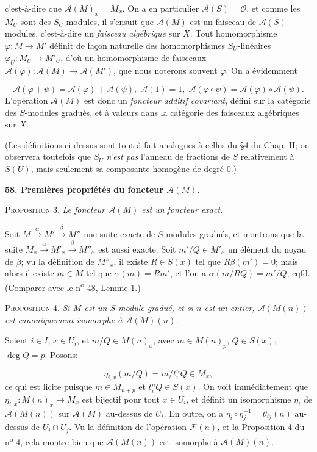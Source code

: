 
 c'est-à-dire que $\mathcal{A}(M)_x = M_x$. On a en particulier $\mathcal{A}(S) = \mathcal{O}$, et comme les $M_U$ sont des $S_U$-modules, il s'ensuit que $\mathcal{A}(M)$ est un faisceau de $\mathcal{A}(S)$-modules, c'est-à-dire un \textit{faisceau algébrique} sur $X$. Tout homomorphisme $\varphi : M \to M'$ définit de façon naturelle des homomorphismes $S_U$-linéaires $\varphi_U : M_U \to M'_U$, d'où un homomorphisme de faisceaux $\mathcal{A}(\varphi) : \mathcal{A}(M) \to \mathcal{A}(M')$, que nous noterons souvent $\varphi$. On a évidemment

\begin{equation*}
\mathcal{A}(\varphi + \psi) = \mathcal{A}(\varphi) + \mathcal{A}(\psi), \; \mathcal{A}(1) = 1, \; \mathcal{A}(\varphi \circ \psi) = \mathcal{A}(\varphi) \circ \mathcal{A}(\psi).
\end{equation*}
L'opération $\mathcal{A}(M)$ est donc un \textit{foncteur additif covariant}, défini sur la catégorie des $S$-modules gradués, et à valeurs dans la catégorie des faisceaux algébriques sur $X$.

(Les définitions ci-dessus sont tout à fait analogues à celles du §4 du Chap. II; on observera toutefois que $S_U$ \textit{n'est pas} l'anneau de fractions de $S$ relativement à $S(U)$, mais seulement sa composante homogène de degré 0.)


\textbf{58. Premières propriétés du foncteur $\mathcal{A}(M)$.}

\textsc{Proposition} 3. \textit{Le foncteur $\mathcal{A}(M)$ est un foncteur exact.}

Soit $M \xrightarrow{\alpha} M' \xrightarrow{\beta} M''$ une suite exacte de $S$-modules gradués, et montrons que la suite $M_x \xrightarrow{\alpha} M'_x \xrightarrow{\beta} M''_x$ est aussi exacte. Soit $m'/Q \in M'_x$ un élément du noyau de $\beta$; vu la définition de $M''_x$, il existe $R \in S(x)$ tel que $R\beta(m') = 0$; mais alors il existe $m \in M$ tel que $\alpha(m) = Rm'$, et l'on a $\alpha(m/RQ) = m'/Q$, cqfd. (Comparer avec le n\textsuperscript{o} 48, Lemme 1.)

\textsc{Proposition} 4. \textit{Si $M$ est un $S$-module gradué, et si $n$ est un entier, $\mathcal{A}(M(n))$ est canoniquement isomorphe à $\mathcal{A}(M)(n)$.}

Soient $i \in I$, $x \in U_i$, et $m/Q \in M(n)_x$, avec $m \in M(n)_p$, $Q \in S(x)$, $\deg Q = p$. Posons:

\begin{equation*}
\eta_{i,x}(m/Q) = m/t_i^n Q \in M_x ,
\end{equation*}
ce qui est licite puisque $m \in M_{n+p}$ et $t_i^n Q \in S(x)$. On voit immédiatement que $\eta_{i,x} : M(n)_x \to M_x$ est bijectif pour tout $x \in U_i$, et définit un isomorphisme $\eta_i$ de $\mathcal{A}(M(n))$ sur $\mathcal{A}(M)$ au-dessus de $U_i$. En outre, on a $\eta_i \circ \eta_j^{-1} = \theta_{ij}(n)$ au-dessus de $U_i \cap U_j$. Vu la définition de l'opération $\mathcal{F}(n)$, et la Proposition 4 du n\textsuperscript{o} 4, cela montre bien que $\mathcal{A}(M(n))$ est isomorphe à $\mathcal{A}(M)(n)$.

